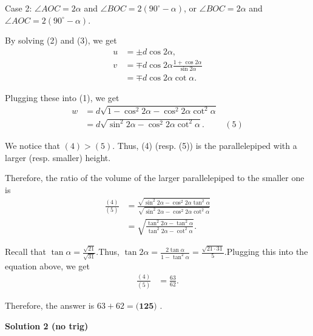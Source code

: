 \begin{enumerate}
{{ Case 2: $\angle AOC = 2 \alpha$ and $\angle BOC = 2 \left( 90^\circ - \alpha \right)$, or $\angle BOC = 2 \alpha$ and $\angle AOC = 2 \left( 90^\circ - \alpha \right)$.

 By solving (2) and (3), we get
 \begin{align*} u & = \pm d \cos 2 \alpha , \\ v & = \mp d \cos 2 \alpha \frac{1 + \cos 2 \alpha}{\sin 2 \alpha} \\ & = \mp d \cos 2 \alpha \cot \alpha . \end{align*}


 Plugging these into (1), we get
 \begin{align*} w & = d \sqrt{1 - \cos^2 2 \alpha - \cos^2 2 \alpha \cot^2 \alpha} \\ & = d \sqrt{\sin^2 2 \alpha - \cos^2 2 \alpha \cot^2 \alpha} . \hspace{1cm} (5) \end{align*}


 We notice that $(4) > (5)$. Thus, (4) (resp. (5)) is the parallelepiped with a larger (resp. smaller) height.

 Therefore, the ratio of the volume of the larger parallelepiped to the smaller one is
 \begin{align*} \frac{(4)}{(5)} & = \frac{\sqrt{\sin^2 2 \alpha - \cos^2 2 \alpha \tan^2 \alpha}} {\sqrt{\sin^2 2 \alpha - \cos^2 2 \alpha \cot^2 \alpha}} \\ & = \sqrt{\frac{\tan^2 2 \alpha - \tan^2 \alpha}{\tan^2 2 \alpha - \cot^2 \alpha}} . \end{align*}


 Recall that $\tan \alpha = \frac{\sqrt{21}}{\sqrt{31}}$.Thus, $\tan 2 \alpha = \frac{2 \tan \alpha}{1 - \tan^2 \alpha} = \frac{\sqrt{21 \cdot 31}}{5}$.Plugging this into the equation above, we get
 \begin{align*} \frac{(4)}{(5)} & = \frac{63}{62}. \end{align*}


 Therefore, the answer is $63 + 62 = \boxed{\textbf{(125) }}$.

 



\textbf{Solution 2 (no trig)}

}}
\end{enumerate}
